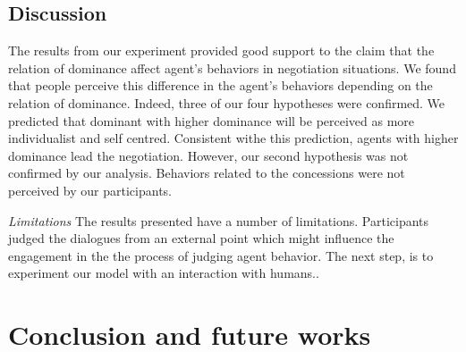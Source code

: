\documentclass{llncs}
\begin{document}
	 \subsection{Discussion}
	 \par  The results from our experiment provided good support to the claim that the relation of dominance affect agent's behaviors in negotiation situations. We found that people perceive this difference in the agent's behaviors depending on the relation of dominance.  Indeed, three of our four hypotheses were confirmed. We predicted that dominant with higher dominance will be perceived as more individualist and self centred. Consistent withe this prediction, agents with higher dominance lead the negotiation. However, our second hypothesis was not confirmed by our analysis. Behaviors related to the concessions were not perceived by our participants.  
	 
	 \textit{Limitations} The results presented have a number of limitations. Participants judged the dialogues from an external point which might influence the engagement in the the process of judging agent behavior. The next step, is to experiment our model with an interaction with humans.. 
	 
	 \section{Conclusion and future works}
	\vskip 4pt
	
	
	
\end{document}
